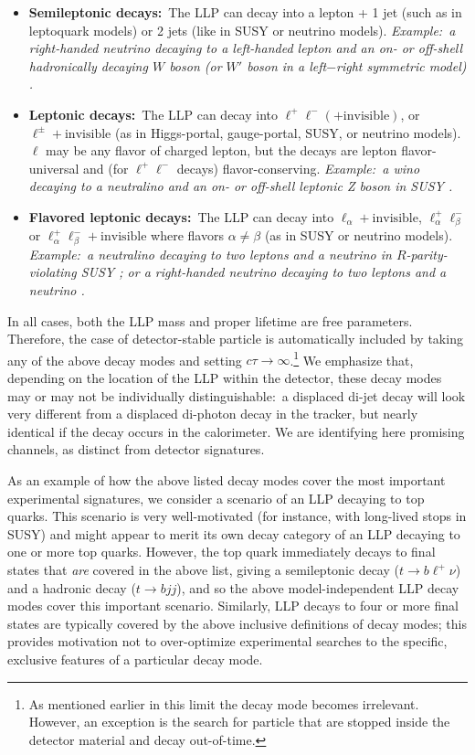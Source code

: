 \begin{itemize}
\item {\bf Semileptonic decays:}~The LLP can decay into a lepton + 1 jet (such as in leptoquark models)
  or 2 jets (like in SUSY or neutrino models). \emph{Example:~a right-handed neutrino decaying to a left-handed
   lepton and an on- or off-shell hadronically decaying $W$ boson (or $W'$ boson in a left$-$right
   symmetric model) \cite{Keung:1983uu}. }

\item {\bf Leptonic decays:}~The LLP can decay into
  $\ell^+\ell^-(+\mathrm{invisible})$, or
  $\ell^\pm+\mathrm{invisible}$ (as in Higgs-portal, gauge-portal,
  SUSY, or neutrino models). $\ell$ may be any flavor of charged
  lepton, but the decays are lepton flavor-universal and (for
  $\ell^+\ell^-$ decays) flavor-conserving. \emph{Example:~a wino decaying
  to a neutralino and an on- or off-shell leptonic Z boson in SUSY \cite{Barbier:2004ez}.}

\item {\bf Flavored leptonic decays:}~The LLP can decay into
  $\ell_\alpha+\mathrm{invisible}$, $\ell_\alpha^+\ell_\beta^-$ or
  $\ell_\alpha^+\ell_\beta^-+\mathrm{invisible}$ where flavors
  $\alpha\neq\beta$ (as in SUSY or neutrino models). \emph{Example:~a neutralino decaying to two
   leptons and a neutrino in $R$-parity-violating SUSY \cite{Barbier:2004ez}; or a right-handed neutrino decaying to 
   two leptons and a neutrino \cite{delAguila:2008cj}.}
\end{itemize}

In all cases, both the LLP mass and proper lifetime are free
parameters.  Therefore, the case of detector-stable particle is automatically included by taking
any of the above decay modes and setting $c\tau\rightarrow\infty$.\footnote{As mentioned 
earlier in this limit the decay mode becomes 
irrelevant. However, an exception is the search for particle that are stopped 
inside the detector material and decay out-of-time.}
We emphasize that, depending on the location of the LLP within the
detector, these decay modes may or may not be individually
distinguishable:~a displaced di-jet decay will look very different from
a displaced di-photon decay in the tracker, but nearly identical if the
decay occurs in the calorimeter.  We are identifying here promising
channels, as distinct from detector signatures. 

As an example of how the above listed decay modes cover the most important
experimental signatures, we consider a scenario of an LLP decaying to
top quarks. This scenario is very well-motivated (for instance, with
long-lived stops in SUSY) and might appear to merit its own decay
category of an LLP decaying to one or more top quarks. 
However, the top quark immediately decays to final states
that \emph{are} covered in the above list, giving a semileptonic
decay ($t\rightarrow b\ell^+\nu$) and a hadronic decay ($t\rightarrow
bjj$), and so the above model-independent LLP decay modes cover this
important scenario. Similarly, LLP decays to four or more final states are typically 
covered by the above inclusive definitions of decay modes; this provides 
motivation not to over-optimize
experimental searches to the specific, exclusive features of a
particular decay mode.

